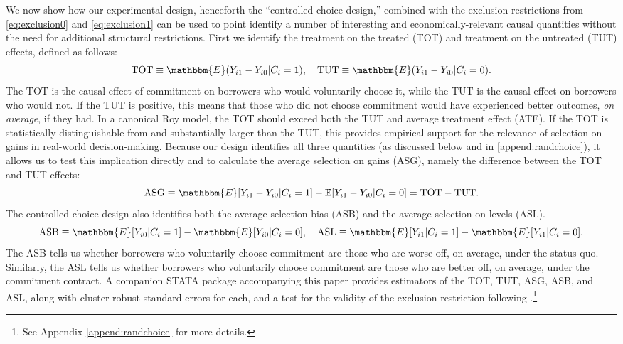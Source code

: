 \documentclass[11pt, a4paper]{article}
\begin{document}
We now show how our experimental design, henceforth the ``controlled choice design,'' combined with the exclusion restrictions from \eqref{eq:exclusion0} and \eqref{eq:exclusion1} can be used to point identify a number of interesting and economically-relevant causal quantities without the need for additional structural restrictions.
First we identify the treatment on the treated (TOT) and treatment on the untreated (TUT) effects, defined as follows:
\[
\text{TOT} \equiv \mathbbm{E}(Y_{i1} - Y_{i0} | C_i = 1), \quad
\text{TUT} \equiv \mathbbm{E}(Y_{i1} - Y_{i0} | C_i = 0).
\]
The TOT is the causal effect of commitment on borrowers who would voluntarily choose it, while the TUT is the causal effect on borrowers who would not.
If the TUT is positive, this means that those who did not choose commitment would have experienced better outcomes, \emph{on average}, if they had. 
In a canonical Roy model, the TOT should exceed both the TUT and average treatment effect (ATE).
If the TOT is statistically distinguishable from and substantially larger than the TUT, this provides empirical support for the relevance of selection-on-gains in real-world decision-making.
Because our design identifies all three quantities (as discussed below and in  \ref{append:randchoice}), it allows us to test this implication directly and to calculate the average selection on gains (ASG), namely the difference between the TOT and TUT effects:
\[
\text{ASG} \equiv \mathbbm{E}[Y_{i1} - Y_{i0}|C_i = 1] - \mathbb{E}[Y_{i1} - Y_{i0} | C_i = 0] = \text{TOT} - \text{TUT}.
\]
The controlled choice design also identifies both the average selection bias (ASB) and the average selection on levels (ASL). 
\[
\text{ASB} \equiv \mathbbm{E}[Y_{i0}|C_i = 1] - \mathbbm{E}[Y_{i0}|C_i = 0], \quad 
\text{ASL} \equiv \mathbbm{E}[Y_{i1}|C_i = 1] - \mathbbm{E}[Y_{i1}|C_i = 0].
\]
The ASB tells us whether borrowers who voluntarily choose commitment are those who are worse off, on average, under the status quo.
Similarly, the ASL tells us whether borrowers who voluntarily choose commitment are those who are better off, on average, under the commitment contract.
A companion STATA package accompanying this paper provides estimators of the TOT, TUT, ASG, ASB, and ASL, along with cluster-robust standard errors for each, and a test for the validity of the exclusion restriction following \cite{huber_mellace}.\footnote{See Appendix \ref{append:randchoice} for more details.}
\end{document}
